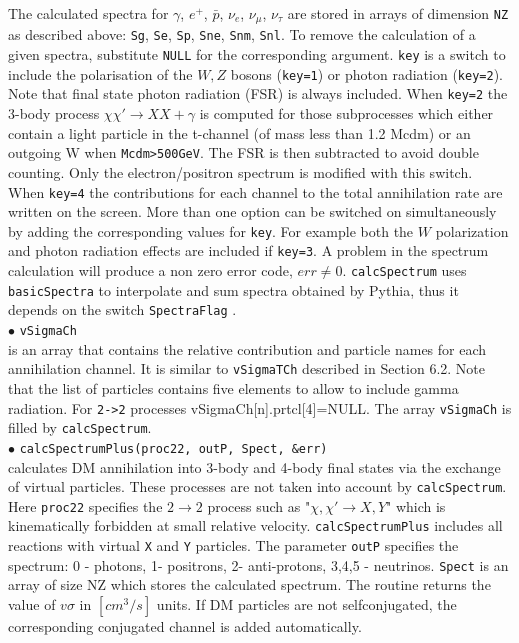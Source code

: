 \documentclass[12pt,a4paper]{article}
\begin{document}
The calculated spectra
for $\gamma$, $e^+$, $\bar{p}$, $\nu_e$, $\nu_{\mu}$, $\nu_{\tau}$ 
are stored in arrays of dimension \verb|NZ| as described above: \verb|Sg|, \verb|Se|, \verb|Sp|, \verb|Sne|, \verb|Snm|, \verb|Snl|. 
 To remove the calculation of a given spectra, substitute  
\verb|NULL| for the corresponding argument. 
\verb|key| is a switch to include the polarisation of the  $W,Z$ bosons (\verb|key=1|) or
 photon radiation (\verb|key=2|).  
 Note that final state photon radiation (FSR) is always included.
When \verb|key=2| the 3-body  process $\chi\chi'\rightarrow XX +\gamma$ is computed for those subprocesses which either contain a light particle in the t-channel (of mass less than 1.2 Mcdm) or an outgoing W when \verb|Mcdm>500GeV|. The FSR is then subtracted to avoid double counting.
Only the electron/positron spectrum is modified with this switch.
When \verb|key=4| the contributions  for each  channel to the total
annihilation rate  are written on the screen. More than one option
can be switched on simultaneously by adding the corresponding values for \verb|key|. 
For example both the $W$ polarization and photon radiation effects  are included if
\verb|key=3|.
A problem in the spectrum calculation will produce a non zero error code, $err\neq
0$. {\tt calcSpectrum} uses {\tt basicSpectra} to  interpolate and sum spectra obtained by Pythia, thus it depends on the switch  {\tt SpectraFlag} .\\



\noindent
$\bullet$ \verb|vSigmaCh| \\
is an array that contains the relative contribution and particle names for each
annihilation channel. It is similar to  {\tt vSigmaTCh}
described in Section 6.2. Note that   the list of particles contains five elements to allow to include  gamma radiation. For \verb|2->2| processes vSigmaCh[n].prtcl[4]=NULL. The array {\tt vSigmaCh} is filled by 
{\tt calcSpectrum}. \\

\noindent
$\bullet$ \verb|calcSpectrumPlus(proc22, outP, Spect, &err)|  \\
calculates  DM annihilation  into 3-body and 4-body final states via the exchange of virtual particles. These processes are not taken into account by {\tt calcSpectrum}. 
Here {\tt proc22} specifies the   $2\to2$ process such as  "$\chi,\chi'\to X,Y$" which is kinematically forbidden at small relative velocity. 
{\tt calcSpectrumPlus} includes all  reactions with virtual {\tt X} and {\tt Y} particles. The parameter {\tt outP} specifies the 
spectrum: 0 - photons, 1- positrons, 2- anti-protons, 3,4,5 - neutrinos. {\tt Spect} is an array of 
size NZ which stores the calculated spectrum. The routine returns the  value of  $v\sigma$ in $[cm^3/s]$ units. If DM particles are not selfconjugated, the corresponding conjugated channel  is added automatically.
\end{document}
